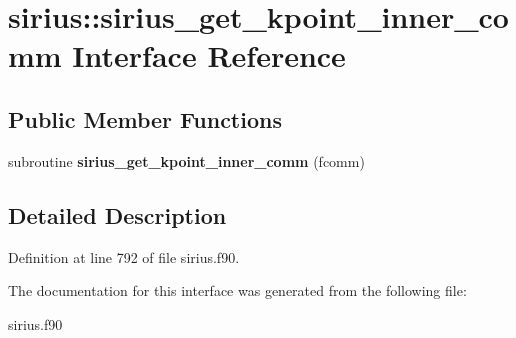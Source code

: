 \hypertarget{interfacesirius_1_1sirius__get__kpoint__inner__comm}{}\section{sirius\+:\+:sirius\+\_\+get\+\_\+kpoint\+\_\+inner\+\_\+comm Interface Reference}
\label{interfacesirius_1_1sirius__get__kpoint__inner__comm}
\subsection*{Public Member Functions}
\begin{DoxyCompactItemize}
\item 
\hypertarget{interfacesirius_1_1sirius__get__kpoint__inner__comm_a611ee96516fab7843853f3e54938cd8c}{}subroutine {\bfseries sirius\+\_\+get\+\_\+kpoint\+\_\+inner\+\_\+comm} (fcomm)\label{interfacesirius_1_1sirius__get__kpoint__inner__comm_a611ee96516fab7843853f3e54938cd8c}

\end{DoxyCompactItemize}


\subsection{Detailed Description}


Definition at line 792 of file sirius.\+f90.



The documentation for this interface was generated from the following file\+:\begin{DoxyCompactItemize}
\item 
sirius.\+f90\end{DoxyCompactItemize}
